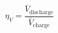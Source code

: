 \documentclass[preview]{standalone}
\begin{document}
\[\eta_V = \frac{\bar{V}_\text{discharge}}{\bar{V}_\text{charge}} \tag{3.14}\]
\end{document}

